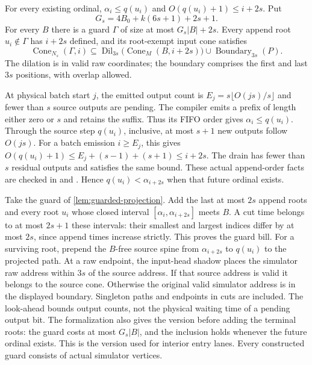 \begin{lemma}\label{lem:cone-transport}
For every existing ordinal, $\alpha_i\le q(u_i)$ and
$O(q(u_i)+1)\le i+2s$. Put
\[
 G_s=4B_0+k(6s+1)+2s+1.
\]
For every $B$ there is a guard $\Gamma$ of size at most $G_s|B|+2s$.
Every append root $u_i\notin\Gamma$ has $i+2s$ defined, and its root-exempt
input cone satisfies
\[
 \operatorname{Cone}_{N_s}(\Gamma,i)
 \subseteq \operatorname{Dil}_{3s}\bigl(\operatorname{Cone}_M(B,i+2s)\bigr)
          \cup\operatorname{Boundary}_{3s}(P).
\]
The dilation is in valid raw coordinates; the boundary comprises the first
and last $3s$ positions, with overlap allowed.
\end{lemma}
\begin{outline}
At physical batch start $j$, the emitted output count is
$E_j=s\lfloor O(js)/s\rfloor$ and fewer than $s$ source outputs are pending.
The compiler emits a prefix of length either zero or $s$ and retains the
suffix. Thus its FIFO order gives $\alpha_i\le q(u_i)$. Through the source
step $q(u_i)$, inclusive, at most $s+1$ new outputs follow $O(js)$.
For a batch emission $i\ge E_j$, this gives
$O(q(u_i)+1)\le E_j+(s-1)+(s+1)\le i+2s$.
The drain has fewer than $s$ residual outputs and satisfies the same bound.
These actual append-order facts are checked in
 and
.
Hence $q(u_i)<\alpha_{i+2s}$ when that future ordinal exists.

Take the guard of \cref{lem:guarded-projection}. Add the last at most $2s$
append roots and every root $u_i$ whose closed interval
$[\alpha_i,\alpha_{i+2s}]$ meets $B$. A cut time belongs to at most $2s+1$
these intervals: their smallest and largest indices differ by at most $2s$,
since append times increase strictly. This proves the guard bill. For a
surviving root, prepend the $B$-free source spine from $\alpha_{i+2s}$ to
$q(u_i)$ to the projected path. At a raw endpoint, the input-head shadow
places the simulator raw address within $3s$ of the source address. If that
source address is valid it belongs to the source cone. Otherwise the original
valid simulator address is in the displayed boundary. Singleton paths and
endpoints in cuts are included. The look-ahead bounds output counts, not the
physical waiting time of a pending output bit.
The formalization also gives the version before adding the terminal roots:
the guard costs at most $G_s|B|$, and the inclusion holds whenever the
future ordinal exists. This is the version used for interior entry lanes.
Every constructed guard consists of actual simulator vertices.
\end{outline}

